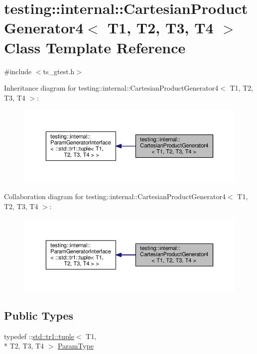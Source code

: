 \hypertarget{classtesting_1_1internal_1_1CartesianProductGenerator4}{\section{testing\-:\-:internal\-:\-:Cartesian\-Product\-Generator4$<$ T1, T2, T3, T4 $>$ Class Template Reference}
\label{classtesting_1_1internal_1_1CartesianProductGenerator4}
}


{\ttfamily \#include $<$ts\-\_\-gtest.\-h$>$}



Inheritance diagram for testing\-:\-:internal\-:\-:Cartesian\-Product\-Generator4$<$ T1, T2, T3, T4 $>$\-:\nopagebreak
\begin{figure}[H]
\begin{center}
\leavevmode
\includegraphics[width=350pt]{classtesting_1_1internal_1_1CartesianProductGenerator4__inherit__graph}
\end{center}
\end{figure}


Collaboration diagram for testing\-:\-:internal\-:\-:Cartesian\-Product\-Generator4$<$ T1, T2, T3, T4 $>$\-:\nopagebreak
\begin{figure}[H]
\begin{center}
\leavevmode
\includegraphics[width=350pt]{classtesting_1_1internal_1_1CartesianProductGenerator4__coll__graph}
\end{center}
\end{figure}
\subsection*{Public Types}
\begin{DoxyCompactItemize}
\item 
typedef \-::\hyperlink{classstd_1_1tr1_1_1tuple}{std\-::tr1\-::tuple}$<$ T1, \\*
T2, T3, T4 $>$ \hyperlink{classtesting_1_1internal_1_1CartesianProductGenerator4_ac8cc31e9f7b2d0b7ee725a60f82edb78}{Param\-Type}
\end{DoxyCompactItemize}

